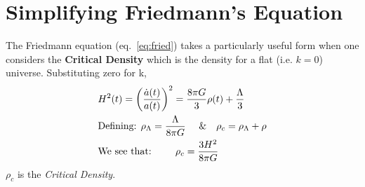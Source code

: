 \documentclass[twoside]{article}
\begin{document}
\section{Simplifying Friedmann's Equation}\label{s:simplify}

The Friedmann equation (eq.~\ref{eq:fried}) takes a particularly useful form  when one considers the \textbf{ Critical Density} which is the density for a flat (i.e. $k=0$) universe. Substituting zero for k,
\begin{align}
&H^{2}(t)=\left(\frac{\dot{a}(t)}{a(t)}\right)^{2} = \frac{8\pi G}{3}\rho(t)+ \frac{\Lambda}{3}\\
&\text{Defining: $\rho_{\Lambda} = \frac{\Lambda}{8\pi G}$ \quad \&\quad  $\rho_{c} = \rho_{\Lambda}+\rho$}\\
&\text{We see that: }\qquad  \rho_{c} = \frac{3H^{2}}{8\pi G}\label{eq:cirtDen}
\end{align}
$\rho_{c}$ is the \emph{Critical Density}.\par
\end{document}
